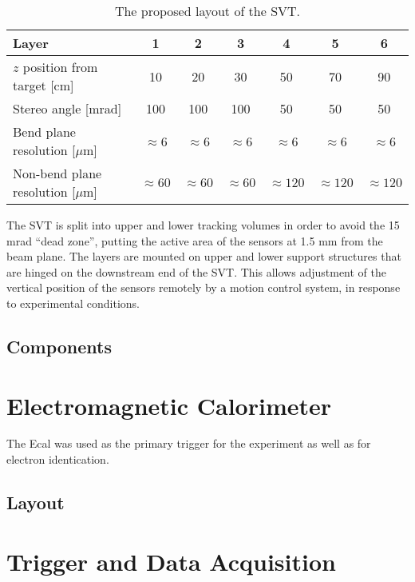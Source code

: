 \begin{table}[t]
\begin{center}
\begin{tabular}{l|cccccc}  
Layer & 1 & 2 & 3 & 4 & 5 & 6 \\ \hline
$z$ position from target [cm]    & 10 & 20 & 30 & 50 & 70 & 90 \\
Stereo angle [mrad] & 100 & 100 & 100 & 50 & 50 & 50 \\
Bend plane resolution [$\mu$m] & $\approx$6 & $\approx$6 & $\approx$6
& $\approx$6 & $\approx$6 & $\approx$6 \\
Non-bend plane resolution [$\mu$m] & $\approx60$ & $\approx60$ & $\approx60$
& $\approx120$ & $\approx120$ & $\approx120$ \\
\hline
\end{tabular}
\caption{The proposed layout of the SVT.}
\label{tab:svt_layout}
\end{center}
\end{table}


The SVT is split into upper and lower tracking volumes in order to avoid
the 15 mrad ``dead zone'', putting the active area of the sensors at 1.5 mm
from the beam plane.  The layers are mounted on upper and lower support 
structures that are hinged on the downstream end of the SVT.  This allows
adjustment of the vertical position of the sensors remotely by a motion
control system, in response to experimental conditions.

\subsection{Components}

\section{Electromagnetic Calorimeter}

The  Ecal  was  used  as  the  primary  trigger  for  the  experiment  as  well  as  for
electron identication. 

\subsection{Layout}

\section{Trigger and Data Acquisition}

